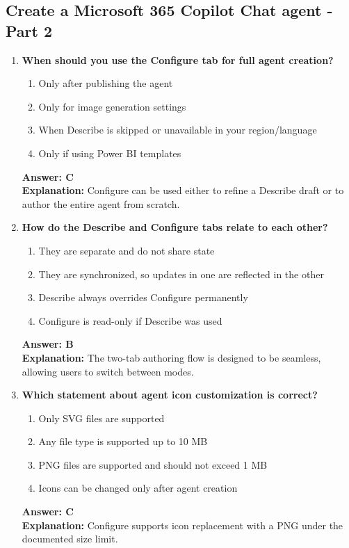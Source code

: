 \documentclass[10pt]{article}
\begin{document}
\subsection{Create a Microsoft 365 Copilot Chat agent - Part 2}
\begin{enumerate}[leftmargin=*]

\item \textbf{When should you use the Configure tab for full agent creation?}
\begin{enumerate}[label=\Alph*.]
  \item Only after publishing the agent
  \item Only for image generation settings
  \item When Describe is skipped or unavailable in your region/language
  \item Only if using Power BI templates
\end{enumerate}
\textbf{Answer: C}\\
\textbf{Explanation:} Configure can be used either to refine a Describe draft or to author the entire agent from scratch.

\item \textbf{How do the Describe and Configure tabs relate to each other?}
\begin{enumerate}[label=\Alph*.]
  \item They are separate and do not share state
  \item They are synchronized, so updates in one are reflected in the other
  \item Describe always overrides Configure permanently
  \item Configure is read-only if Describe was used
\end{enumerate}
\textbf{Answer: B}\\
\textbf{Explanation:} The two-tab authoring flow is designed to be seamless, allowing users to switch between modes.

\item \textbf{Which statement about agent icon customization is correct?}
\begin{enumerate}[label=\Alph*.]
  \item Only SVG files are supported
  \item Any file type is supported up to 10 MB
  \item PNG files are supported and should not exceed 1 MB
  \item Icons can be changed only after agent creation
\end{enumerate}
\textbf{Answer: C}\\
\textbf{Explanation:} Configure supports icon replacement with a PNG under the documented size limit.


\end{enumerate}
\end{document}

